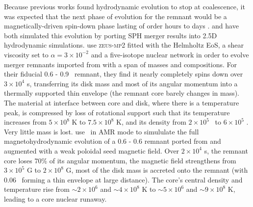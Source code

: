 Because previous works found hydrodynamic evolution to stop at coalescence, it was expected that the next phase of evolution for the remnant would be a magnetically-driven spin-down phase lasting of order hours to days \citep{vkercj10, shen+12}.  \cite{schw+12} and \cite{ji+13} have both simulated this evolution by porting SPH merger results into 2.5D hydrodynamic simulations.  \citeauthor{schw+12} use \textsc{zeus-mp2} fitted with the Helmholtz EoS, a \cite{shaks73} shear viscosity set to $\alpha = 3 \times 10^{-2}$ and a five-isotope nuclear network in order to evolve merger remnants imported from \cite{dan+11} with a span of masses and compositions.  For their fiducial 0.6 - 0.9 \Msun\ remnant, they find it nearly completely spins down over $3\times10^4$ s, transferring its disk mass and most of its angular momentum into a thermally supported thin envelope (the remnant core barely changes in mass).  The material at interface between core and disk, where there is a temperature peak, is compressed by loss of rotational support such that its temperature increases from $5\times10^8$ K to $7.5\times10^8$ K, and its density from $2\times10^5$ \gcc\ to $6\times10^5$ \gcc.  Very little mass is lost.  \citeauthor{ji+13} use \flash\ in AMR mode to simululate the full magnetohydrodynamic evolution of a 0.6 - 0.6 \Msun remnant ported from \citeauthor{loreig09} and augmented with a weak poloidal seed magnetic field.  Over $2\times10^4$ s, the remnant core loses 70\% of its angular momentum, the magnetic field strengthens from $3\times10^5$ G to $2\times10^8$ G, most of the disk mass is accreted onto the remnant (with 0.06 \Msun\ forming a thin envelope at large distance).  The core's central density and temperature rise from $\sim2\times10^6$ \gcc and $\sim4\times10^8$ K to $\sim5\times10^6$ \gcc and $\sim9\times10^8$ K, leading to a core nuclear runaway.

